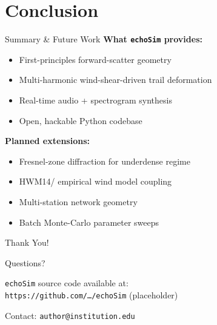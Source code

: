 \documentclass[aspectratio=169,11pt]{beamer}
\begin{document}
\section{Conclusion}
\begin{frame}{Summary \& Future Work}
\textbf{What \texttt{echoSim} provides:}
\begin{itemize}
    \item First-principles forward-scatter geometry
    \item Multi-harmonic wind-shear-driven trail deformation
    \item Real-time audio + spectrogram synthesis
    \item Open, hackable Python codebase
\end{itemize}

\vspace{0.5em}
\textbf{Planned extensions:}
\begin{itemize}
    \item Fresnel-zone diffraction for underdense regime
    \item HWM14/ empirical wind model coupling
    \item Multi-station network geometry
    \item Batch Monte-Carlo parameter sweeps
\end{itemize}
\end{frame}

\begin{frame}
\begin{center}
\Huge Thank You!
\vspace{1cm}

\Large Questions?
\vspace{1.5cm}

\normalsize
\texttt{echoSim} source code available at: \\
\texttt{https://github.com/\dots/echoSim} (placeholder)
\vspace{0.5em}

Contact: \texttt{author@institution.edu}
\end{center}
\end{frame}
\end{document}
